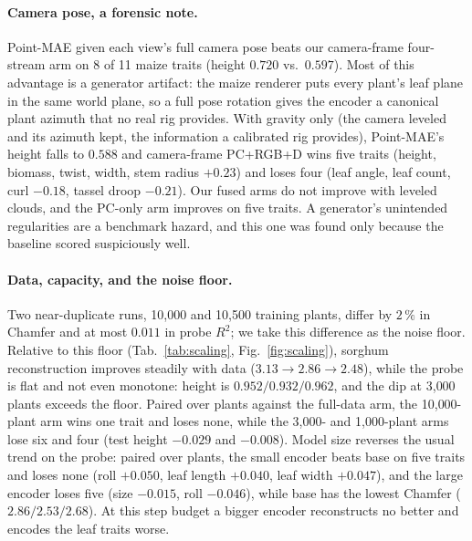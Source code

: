\paragraph{Camera pose, a forensic note.}
Point-MAE given each view's full camera pose beats our camera-frame four-stream
arm on 8 of 11 maize traits (height $0.720$ vs.\ $0.597$). Most of this
advantage is a generator artifact: the maize renderer puts every plant's leaf
plane in the same world plane, so a full pose rotation gives the encoder a
canonical plant azimuth that no real rig provides. With gravity only (the camera
leveled and its azimuth kept, the information a calibrated rig provides),
Point-MAE's height falls to $0.588$ and camera-frame PC+RGB+D wins five traits
(height, biomass, twist, width, stem radius $+0.23$) and loses four (leaf angle,
leaf count, curl $-0.18$, tassel droop $-0.21$). Our fused arms do not improve
with leveled clouds, and the PC-only arm improves on five traits. A generator's
unintended regularities are a benchmark hazard, and this one was found only
because the baseline scored suspiciously well.

\paragraph{Data, capacity, and the noise floor.}
Two near-duplicate runs, 10{,}000 and 10{,}500 training plants, differ by
$2\,\%$ in Chamfer and at most $0.011$ in probe $R^2$; we take this difference
as the noise floor. Relative to this floor (Tab.~\ref{tab:scaling},
Fig.~\ref{fig:scaling}), sorghum reconstruction improves steadily with data
($3.13 \to 2.86 \to 2.48$), while the probe is flat and not even monotone:
height is $0.952 / 0.932 / 0.962$, and the dip at 3{,}000 plants exceeds the
floor. Paired over plants against the full-data arm, the 10{,}000-plant arm wins
one trait and loses none, while the 3{,}000- and 1{,}000-plant arms lose six and
four (test height $-0.029$ and $-0.008$). Model size reverses the usual trend on the probe: paired over plants,
the small encoder beats base on five traits and loses none (roll $+0.050$, leaf
length $+0.040$, leaf width $+0.047$), and the large encoder loses five (size
$-0.015$, roll $-0.046$), while base has the lowest Chamfer
($2.86 / 2.53 / 2.68$). At this step budget a bigger encoder reconstructs no
better and encodes the leaf traits worse.

